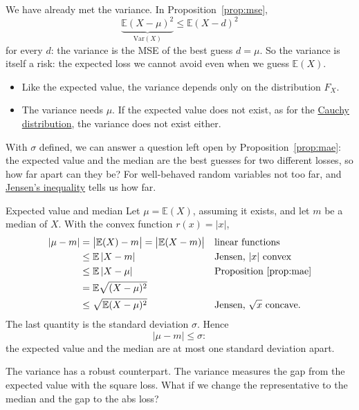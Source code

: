 \documentclass[a4paper,12pt,oneside]{report}
\begin{document}
We have already met the variance. In Proposition~\ref{prop:mse},
\[
\underbrace{\mathbb{E}(X-\mu)^2}_{\mathrm{Var}(X)}\le\mathbb{E}(X-d)^2
\]
for every $d$: the variance is the MSE of the best guess $d=\mu$. So the variance is itself a risk: the expected loss we cannot avoid
even when we guess $\mathbb{E}(X)$.

\begin{notebox}
\begin{itemize}
\item Like the expected value, the variance depends only on the
distribution $F_X$.
\item The variance needs $\mu$. If the expected value does not exist, as
for the \hyperref[sec:may-not-exist]{Cauchy distribution}, the variance
does not exist either.
\end{itemize}
\end{notebox}

With $\sigma$ defined, we can answer a question left open by
Proposition~\ref{prop:mae}: the expected value and the median are the best
guesses for two different losses, so how far apart can they be? For
well-behaved random variables not too far, and
\hyperref[thm:jensen]{Jensen's inequality} tells us how far.

\begin{framedexample}{Expected value and median}\label{ex:mean-median}
Let $\mu=\mathbb{E}(X)$, assuming it exists, and let $m$ be a median of
$X$. With the convex function $r(x)=|x|$,
\begin{align*}
|\mu-m|&=\big|\mathbb{E}(X)-m\big|=\big|\mathbb{E}(X-m)\big|
&&\text{linear functions}\\
&\le\mathbb{E}\,|X-m|&&\text{Jensen, $|x|$ convex}\\
&\le\mathbb{E}\,|X-\mu|&&\text{Proposition~\ref{prop:mae}}\\
&=\mathbb{E}\sqrt{(X-\mu)^2}\\
&\le\sqrt{\mathbb{E}(X-\mu)^2}&&\text{Jensen, $\sqrt{x}$ concave.}
\end{align*}
The last quantity is the standard deviation $\sigma$. Hence
\[
|\mu-m|\le\sigma :
\]
the expected value and the median are at most one standard deviation apart.
\end{framedexample}

The variance has a robust counterpart. The variance measures the gap from
the expected value with the square loss. What if we change the
representative to the median and the gap to the abs loss?
\end{document}
